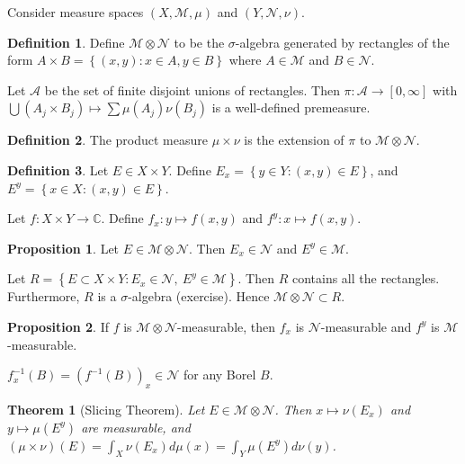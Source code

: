 \documentclass[11pt]{article}
\newtheorem{thm}{Theorem}[section]
\theoremstyle{definition}
\newtheorem{defn}{Definition}[section]
\newtheorem{prop}{Proposition}[section]
\newcommand{\set}[1]{\left\{ #1 \right\}}
\newcommand{\CC}{\mathbb{C}}
\newcommand{\m}[1]{\mathcal{#1}}
\begin{document}
Consider measure spaces $(X,\m{M},\mu)$ and $(Y,\m{N},\nu)$. 

\begin{defn}
  Define $\m{M}\otimes\m{N}$ to be the $\sigma$-algebra generated by rectangles of the form
  $A\times B = \set{(x,y):x\in A, y\in B}$ where $A\in\m{M}$ and $B\in\m{N}$.
\end{defn}

Let $\m{A}$ be the set of finite disjoint unions of rectangles. Then
$\pi:\m{A}\to[0,\infty]$ with $\bigcup(A_j\times B_j)\mapsto\sum\mu(A_j)\nu(B_j)$ is a
well-defined premeasure.

\begin{defn}
  The product measure $\mu\times\nu$ is the extension of $\pi$ to $\m{M}\otimes\m{N}$.
\end{defn}

\begin{defn}
  Let $E\in X\times Y$. Define $E_x=\set{y\in Y:(x,y)\in E}$, and $E^y=\set{x\in X:(x,y)\in
  E}$.

  Let $f:X\times Y\to\CC$. Define $f_x:y\mapsto f(x,y)$ and $f^y:x\mapsto f(x,y)$.
\end{defn}

\begin{prop}
  Let $E\in\m{M}\otimes\m{N}$. Then $E_x\in\m{N}$ and $E^y\in\m{M}$. 
\end{prop}
\proof
  Let $R=\set{E\subset X\times Y:E_x\in\m{N},~E^y\in\m{M}}$. Then $R$ contains all the
  rectangles. Furthermore, $R$ is a $\sigma$-algebra (exercise). Hence
  $\m{M}\otimes\m{N}\subset R$. 
\qedhere

\begin{prop}
  If $f$ is $\m{M}\otimes\m{N}$-measurable, then $f_x$ is $\m{N}$-measurable and $f^y$ is
  $\m{M}$-measurable. 
\end{prop}
\proof
  $f_x^{-1}(B)=(f^{-1}(B))_x\in\m{N}$ for any Borel $B$. 
\qedhere




\begin{thm}[Slicing Theorem]
  Let $E\in\m{M}\otimes\m{N}$. Then $x\mapsto\nu(E_x)$ and $y\mapsto\mu(E^y)$ are
  measurable, and $(\mu\times\nu)(E)=\int_X\nu(E_x)d\mu(x)=\int_Y\mu(E^y)d\nu(y)$.
\end{thm}
\end{document}
